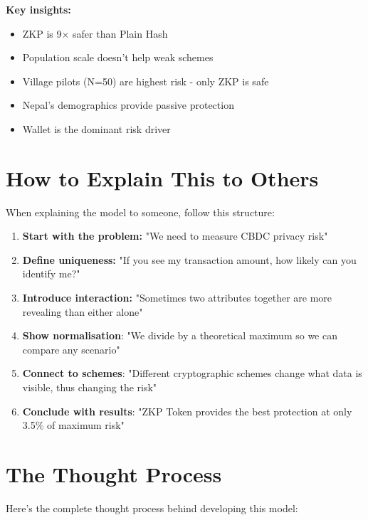 \documentclass[12pt,a4paper,oneside,openany]{report}
\begin{document}
\textbf{Key insights:}
\begin{itemize}
    \item ZKP is 9× safer than Plain Hash
    \item Population scale doesn't help weak schemes
    \item Village pilots (N=50) are highest risk - only ZKP is safe
    \item Nepal's demographics provide passive protection
    \item Wallet is the dominant risk driver
\end{itemize}

\section{How to Explain This to Others}
\label{sec:explain}

When explaining the model to someone, follow this structure:

\begin{enumerate}
    \item \textbf{Start with the problem:} "We need to measure CBDC privacy risk"
    \item \textbf{Define uniqueness:} "If you see my transaction amount, how likely can you identify me?"
    \item \textbf{Introduce interaction:} "Sometimes two attributes together are more revealing than either alone"
    \item \textbf{Show normalisation}: "We divide by a theoretical maximum so we can compare any scenario"
    \item \textbf{Connect to schemes}: "Different cryptographic schemes change what data is visible, thus changing the risk"
    \item \textbf{Conclude with results}: "ZKP Token provides the best protection at only 3.5\% of maximum risk"
\end{enumerate}

\section{The Thought Process}
\label{sec:thought}

Here's the complete thought process behind developing this model:
\end{document}

